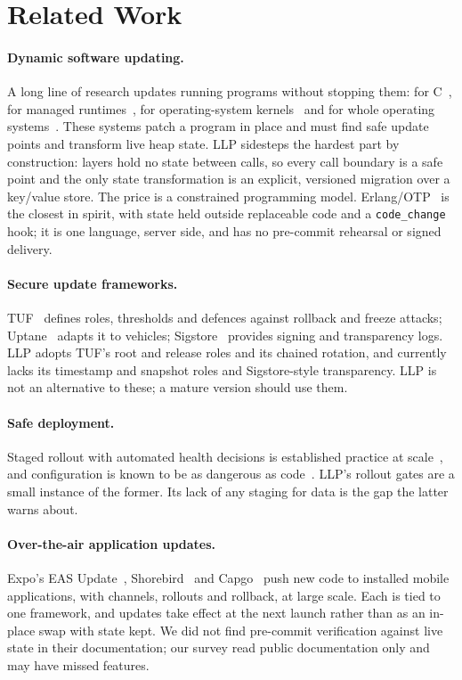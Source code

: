 \documentclass[10pt,twocolumn]{article}
\newcommand{\code}[1]{\texttt{#1}}
\begin{document}
\section{Related Work}
\label{sec:related}

\paragraph{Dynamic software updating.} A long line of research updates running programs without
stopping them: for C~\cite{hicks2005dsu,neamtiu2006ginseng,hayden2012kitsune}, for managed
runtimes~\cite{subramanian2009jvolve}, for operating-system kernels~\cite{arnold2009ksplice} and
for whole operating systems~\cite{giuffrida2013proteos}. These systems patch a program in place
and must find safe update points and transform live heap state. LLP sidesteps the hardest part by
construction: layers hold no state between calls, so every call boundary is a safe point and the
only state transformation is an explicit, versioned migration over a key/value store. The price is
a constrained programming model. Erlang/OTP~\cite{armstrong2003} is the closest in spirit, with
state held outside replaceable code and a \code{code\_change} hook; it is one language, server
side, and has no pre-commit rehearsal or signed delivery.

\paragraph{Secure update frameworks.} TUF~\cite{samuel2010tuf} defines roles, thresholds and
defences against rollback and freeze attacks; Uptane~\cite{kuppusamy2016uptane} adapts it to
vehicles; Sigstore~\cite{newman2022sigstore} provides signing and transparency logs. LLP adopts
TUF's root and release roles and its chained rotation, and currently lacks its timestamp and
snapshot roles and Sigstore-style transparency. LLP is not an alternative to these; a mature
version should use them.

\paragraph{Safe deployment.} Staged rollout with automated health decisions is established
practice at scale~\cite{li2020gandalf}, and configuration is known to be as dangerous as
code~\cite{tang2015config}. LLP's rollout gates are a small instance of the former. Its lack of
any staging for data is the gap the latter warns about.

\paragraph{Over-the-air application updates.} Expo's EAS Update~\cite{expoupdates},
Shorebird~\cite{shorebird2025} and Capgo~\cite{capgo} push new code to installed mobile
applications, with channels, rollouts and rollback, at large scale. Each is tied to one framework,
and updates take effect at the next launch rather than as an in-place swap with state kept. We
did not find pre-commit verification against live state in their documentation; our survey read
public documentation only and may have missed features.
\end{document}
